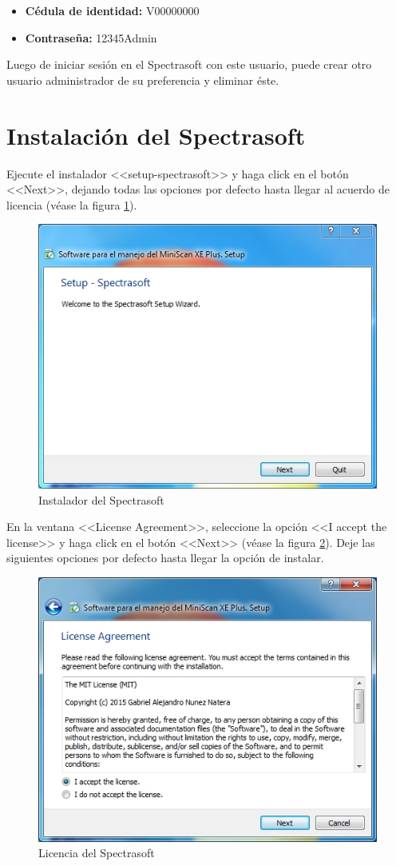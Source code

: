 \begin{itemize}
	\item \textbf{C\'{e}dula de identidad:} V00000000
	
	\item \textbf{Contrase\~{n}a:} 12345Admin
\end{itemize}

Luego de iniciar sesi\'{o}n en el Spectrasoft con este usuario, puede crear otro usuario administrador de su preferencia y eliminar \'{e}ste.

\section*{Instalaci\'{o}n del Spectrasoft}

Ejecute el instalador <<setup-spectrasoft>> y haga click en el bot\'{o}n <<Next>>, dejando todas las opciones por defecto hasta llegar al acuerdo de licencia (v\'{e}ase la figura \ref{fig:spectrasoft-setup}).

\begin{figure}[H]
  \centering
  \includegraphics[width=.5\linewidth]{./img/spectrasoft-setup.jpg}
\caption[]{Instalador del Spectrasoft\label{fig:spectrasoft-setup}}
\end{figure}

En la ventana <<License Agreement>>, seleccione la opci\'{o}n <<I accept the license>> y haga click en el bot\'{o}n <<Next>> (v\'{e}ase la figura \ref{fig:spectrasoft-licencia}). Deje las siguientes opciones por defecto hasta llegar la opci\'{o}n de instalar.

\begin{figure}[H]
  \centering
  \includegraphics[width=.5\linewidth]{./img/spectrasoft-licencia.jpg}
\caption[]{Licencia del Spectrasoft\label{fig:spectrasoft-licencia}}
\end{figure}

